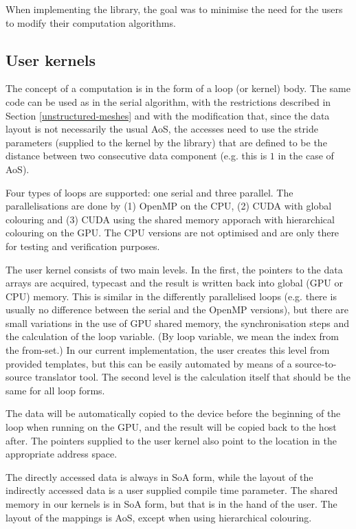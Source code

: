 When implementing the library, the goal was to minimise the need for the users
to modify their computation algorithms.

\subsection{User kernels}

The concept of a computation is in the form of a loop (or kernel) body. The same
code can be used as in the serial algorithm, with the restrictions described in
Section \ref{unstructured-meshes} and with the modification that, since the data
layout is not necessarily the usual AoS, the accesses need to use the stride
parameters (supplied to the kernel by the library) that are defined to be the
distance between two consecutive data component (e.g. this is $1$ in the case of
AoS).

Four types of loops are supported: one serial and three parallel. The
parallelisations are done by (1) OpenMP on the CPU, (2) CUDA with global
colouring and (3) CUDA using the shared memory apporach with hierarchical
colouring on the GPU. The CPU versions are not optimised and are only there for
testing and verification purposes.

The user kernel consists of two main levels. In the first, the pointers to the
data arrays are acquired, typecast and the result is written back into global
(GPU or CPU) memory. This is similar in the differently parallelised loops (e.g.
there is usually no difference between the serial and the OpenMP versions), but
there are small variations in the use of GPU shared memory, the synchronisation
steps and the calculation of the loop variable. (By loop variable, we mean the
index from the from-set.) In our current implementation, the user creates this
level from provided templates, but this can be easily automated by means of a
source-to-source translator tool. The second level is the calculation itself
that should be the same for all loop forms.

The data will be automatically copied to the device before the beginning of the
loop when running on the GPU, and the result will be copied back to the host
after. The pointers supplied to the user kernel also point to the location in
the appropriate address space.

The directly accessed data is always in SoA form, while the layout of the
indirectly accessed data is a user supplied compile time parameter. The shared
memory in our kernels is in SoA form, but that is in the hand of the user. The
layout of the mappings is AoS, except when using hierarchical colouring.

